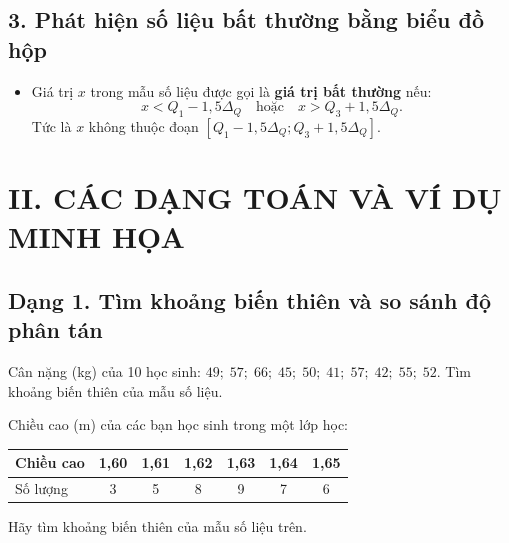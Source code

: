 \subsection*{3. Phát hiện số liệu bất thường bằng biểu đồ hộp}
\begin{itemize}
	\item Giá trị $x$ trong mẫu số liệu được gọi là \textbf{giá trị bất thường} nếu:
	\[x < Q_1 - 1{,}5\Delta_Q \quad \text{hoặc} \quad x > Q_3 + 1{,}5\Delta_Q.\]
	Tức là $x$ không thuộc đoạn $[Q_1 - 1{,}5\Delta_Q; Q_3 + 1{,}5\Delta_Q]$.
\end{itemize}

\vspace{0.3cm}
\section*{II. CÁC DẠNG TOÁN VÀ VÍ DỤ MINH HỌA}

\subsection*{Dạng 1. Tìm khoảng biến thiên và so sánh độ phân tán}

\begin{vd}
	Cân nặng (kg) của 10 học sinh: $49;\; 57;\; 66;\; 45;\; 50;\; 41;\; 57;\; 42;\; 55;\; 52$. Tìm khoảng biến thiên của mẫu số liệu.
\end{vd}

\begin{vd}
	Chiều cao (m) của các bạn học sinh trong một lớp học:
	\begin{center}
	\begin{tabular}{|l|c|c|c|c|c|c|}
		\hline
		Chiều cao & 1,60 & 1,61 & 1,62 & 1,63 & 1,64 & 1,65 \\
		\hline
		Số lượng & 3 & 5 & 8 & 9 & 7 & 6 \\
		\hline
	\end{tabular}
	\end{center}
	Hãy tìm khoảng biến thiên của mẫu số liệu trên.
\end{vd}

